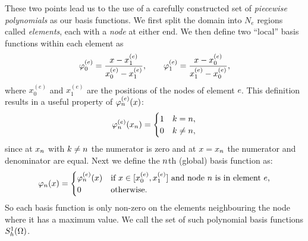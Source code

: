 These two points lead us to the use of a carefully constructed set of \emph{piecewise polynomials} as our basis functions.
We first split the domain into $N_e$ regions called \emph{elements}, each with a \emph{node} at either end.
We then define two ``local'' basis functions within each element as
\begin{equation}
  \varphi^{(e)}_{0}=\dfrac{x-x^{(e)}_{1}}{x^{(e)}_{0}-x^{(e)}_{1}},\qquad
  \varphi^{(e)}_{1}=\dfrac{x-x^{(e)}_{0}}{x^{(e)}_{1}-x^{(e)}_{0}},
  \label{eq:simple_lagrange}
\end{equation}
where $x^{(e)}_0$ and $x^{(e)}_1$ are the positions of the nodes of element $e$.
This definition results in a useful property of $\varphi^{(e)}_{n}(x)$:
\begin{equation}
  \label{eq:35}
  \varphi^{(e)}_{n}(x_{n}) =
  \begin{cases}
    1 & k = n, \\
    0 & k \neq n,
  \end{cases}
\end{equation}
since at $x_{n}$ with $k \neq n$ the numerator is zero and at $x = x_{n}$ the numerator and denominator are equal.
Next we define the $n$th (global) basis function as:
\begin{equation}
  \label{eq:33}
  \varphi_n(x) =
  \begin{cases}
    \varphi_n^{(e)}(x) & \text{if $x \in [x^{(e)}_0, x^{(e)}_1]$ and node $n$ is in element $e$,} \\
    0 & \text{otherwise.}
  \end{cases}
\end{equation}
So each basis function is only non-zero on the elements neighbouring the node where it has a maximum value.
We call the set of such polynomial basis functions ${S_h^1(\Omega)}$.

